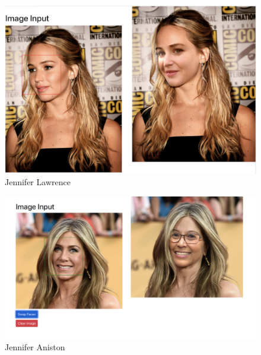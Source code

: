 


\begin{figure}[t]
    \centering
    \includegraphics[width=\linewidth]{Screen Shot 2022-05-09 at 4.06.05 PM.png}
    \caption{Jennifer Lawrence}
    \label{fig:result1}
\end{figure}

\begin{figure}[t]
    \centering
    \includegraphics[width=\linewidth]{jennifer_aniston_result.png}
    \caption{Jennifer Aniston}
    \label{fig:result2}
\end{figure}

